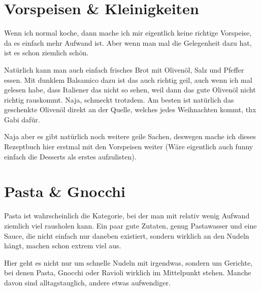 \documentclass[
a4paper,
11pt
]{article}
\begin{document}
\section{Vorspeisen \& Kleinigkeiten}

Wenn ich normal koche, dann mache ich mir eigentlich keine richtige Vorspeise, da es einfach mehr Aufwand ist. Aber wenn man mal die Gelegenheit dazu hat, ist es schon ziemlich schön.

Natürlich kann man auch einfach frisches Brot mit Olivenöl, Salz und Pfeffer essen. Mit dunklem Balsamico dazu ist das auch richtig geil, auch wenn ich mal gelesen habe, dass Italiener das nicht so sehen, weil dann das gute Olivenöl nicht richtig rauskommt. Naja, schmeckt trotzdem. Am besten ist natürlich das geschenkte Olivenöl direkt an der Quelle, welches jedes Weihnachten kommt, thx Gabi dafür.

Naja aber es gibt natürlich noch weitere geile Sachen, deswegen mache ich dieses Rezeptbuch hier erstmal mit den Vorspeisen weiter (Wäre eigentlich auch funny einfach die Desserts als erstes aufzulisten).


\mylocaltableofcontents%
\newpage









\section{Pasta \& Gnocchi}

Pasta ist wahrscheinlich die Kategorie, bei der man mit relativ wenig Aufwand ziemlich viel rausholen kann. Ein paar gute Zutaten, genug Pastawasser und eine Sauce, die nicht einfach nur daneben existiert, sondern wirklich an den Nudeln hängt, machen schon extrem viel aus.

Hier geht es nicht nur um schnelle Nudeln mit irgendwas, sondern um Gerichte, bei denen Pasta, Gnocchi oder Ravioli wirklich im Mittelpunkt stehen. Manche davon sind alltagstauglich, andere etwas aufwendiger.

\mylocaltableofcontents%
\newpage









\end{document}
